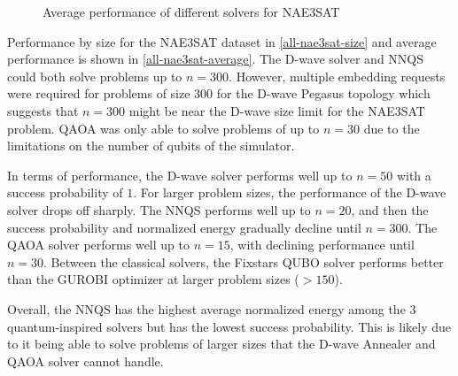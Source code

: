 \begin{figure}[!htbp]
    \centering
    \hfill
    \caption{Average performance of different solvers for NAE3SAT}
    \label{all-nae3sat-average}
\end{figure}

Performance by size for the NAE3SAT dataset in \autoref{all-nae3sat-size} and average performance is shown in \autoref{all-nae3sat-average}. The D-wave solver and NNQS could both solve problems up to $n=300$. However, multiple embedding requests were required for problems of size $300$ for the D-wave Pegasus topology which suggests that $n=300$ might be near the D-wave size limit for the NAE3SAT problem. QAOA was only able to solve problems of up to $n=30$ due to the limitations on the number of qubits of the simulator.

In terms of performance, the D-wave solver performs well up to $n=50$ with a success probability of $1$. For larger problem sizes, the performance of the D-wave solver drops off sharply. The NNQS performs well up to $n=20$, and then the success probability and normalized energy gradually decline until $n=300$. The QAOA solver performs well up to $n=15$, with declining performance until $n=30$. Between the classical solvers, the Fixstars QUBO solver performs better than the GUROBI optimizer at larger problem sizes ($>150$).

Overall, the NNQS has the highest average normalized energy among the 3 quantum-inspired solvers but has the lowest success probability. This is likely due to it being able to solve problems of larger sizes that the D-wave Annealer and QAOA solver cannot handle.

